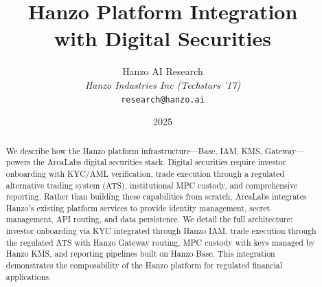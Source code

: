 \documentclass[11pt]{article}
\title{Hanzo Platform Integration\\[0.3em]
{\large with Digital Securities}}
\author{
    Hanzo AI Research \\
    \textit{Hanzo Industries Inc (Techstars '17)} \\
    \texttt{research@hanzo.ai}
}
\date{2025}
\begin{document}
\hanzocoverpage

\begin{abstract}
We describe how the Hanzo platform infrastructure---Base, IAM, KMS,
Gateway---powers the ArcaLabs digital securities stack. Digital securities
require investor onboarding with KYC/AML verification, trade execution
through a regulated alternative trading system (ATS), institutional MPC
custody, and comprehensive reporting. Rather than building these
capabilities from scratch, ArcaLabs integrates Hanzo's existing platform
services to provide identity management, secret management, API routing,
and data persistence. We detail the full architecture: investor
onboarding via KYC integrated through Hanzo IAM, trade execution
through the regulated ATS with Hanzo Gateway routing, MPC custody with
keys managed by Hanzo KMS, and reporting pipelines built on Hanzo Base.
This integration demonstrates the composability of the Hanzo platform for
regulated financial applications.
\end{abstract}











\end{document}
